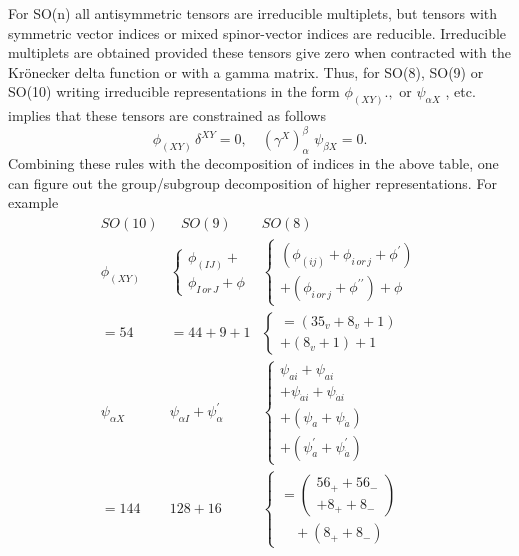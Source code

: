 For SO(n) all antisymmetric tensors are irreducible multiplets, but tensors
with symmetric vector indices or mixed spinor-vector indices are reducible.
Irreducible multiplets are obtained provided these tensors give zero when
contracted with the Kr\"onecker delta function or with a gamma matrix. Thus,
for SO(8), SO(9) or SO(10) writing irreducible representations in the form $%
\phi _{\left( XY\right) }.,$ or $\psi _{\alpha X}$ , etc. implies that these
tensors are constrained as follows
\begin{equation}
\phi _{(XY)}\,\delta ^{XY}=0,\quad \left( \gamma ^X\right) _\alpha ^\beta
\,\,\psi _{\beta X}=0.
\end{equation}
Combining these rules with the decomposition of indices in the above table,
one can figure out the group/subgroup decomposition of higher
representations. For example
\begin{equation}
\begin{array}{lll}
SO(10) &
\begin{array}{l}
\\
\end{array}
SO(9) & SO(8) \\
\phi _{(XY)} & \left\{
\begin{array}{l}
\phi _{(IJ)}+ \\
\phi _{I\,or\,J}+\phi
\end{array}
\right. & \left\{
\begin{array}{l}
(\phi _{(ij)}+\phi _{i\,or\,j}+\phi ^{\prime }) \\
+(\phi _{i\,or\,j}+\phi ^{\prime \prime })+\phi
\end{array}
\right. \\
=54 & =44+9+1 & \left\{
\begin{array}{l}
=(35_v+8_v+1) \\
+(8_v+1)+1
\end{array}
\right. \\
\psi _{\alpha X} & \psi _{\alpha I}+\psi _\alpha ^{\prime } & \left\{
\begin{array}{l}
\psi _{ai}+\psi _{ai} \\
+\psi _{\dot ai}+\psi _{\dot ai} \\
+(\psi _a+\psi _{\dot a}) \\
+(\psi _a^{\prime }+\psi _{\dot a}^{\prime })
\end{array}
\right. \\
=144 & 128+16 & \left\{
\begin{array}{l}
=\left(
\begin{array}{c}
56_{+}+56_{-} \\
+8_{+}+8_{-}
\end{array}
\right) \\
\quad +(8_{+}+8_{-})
\end{array}
\right.
\end{array}
\end{equation}

